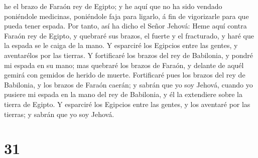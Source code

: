 he el brazo de Faraón rey de Egipto; y he aquí que no ha sido vendado
poniéndole medicinas, poniéndole faja para ligarlo, á fin de vigorizarle
para que pueda tener espada.  Por tanto, así ha dicho el
Señor Jehová: Heme aquí contra Faraón rey de Egipto, y quebraré sus
brazos, el fuerte y el fracturado, y haré que la espada se le caiga de
la mano.  Y esparciré los Egipcios entre las gentes, y
aventarélos por las tierras.  Y fortificaré los brazos del
rey de Babilonia, y pondré mi espada en su mano; mas quebraré los brazos
de Faraón, y delante de aquél gemirá con gemidos de herido de muerte.
 Fortificaré pues los brazos del rey de Babilonia, y los
brazos de Faraón caerán; y sabrán que yo soy Jehová, cuando yo pusiere
mi espada en la mano del rey de Babilonia, y él la extendiere sobre la
tierra de Egipto.  Y esparciré los Egipcios entre las
gentes, y los aventaré por las tierras; y sabrán que yo soy Jehová.

\hypertarget{section-30}{%
\section{31}\label{section-30}}


